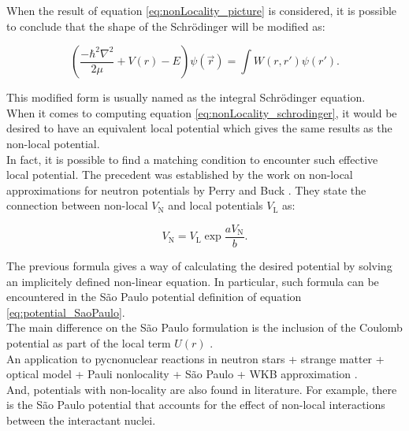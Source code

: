 \documentclass[openany]{book}
\begin{document}
When the result of equation \ref{eq:nonLocality_picture} is considered, it is possible to conclude that the shape of the Schrödinger will be modified as:

\begin{equation} \label{eq:nonLocality_schrodinger}
	\left(\frac{-\hbar^2 \nabla^2}{2\mu} + V(r)  - E  \right) \psi(\vec r) =   \int W(r, r') \psi(r').
\end{equation}

This modified form is usually named as the integral Schrödinger equation. \\

When it comes to computing equation \ref{eq:nonLocality_schrodinger}, it would be desired to have an equivalent local potential which gives the same results as the non-local potential. \\

In fact, it is possible to find a matching condition to encounter such effective local potential. The precedent was established by the work on non-local approximations for neutron potentials by Perry and Buck \cite{perey_buck_1962}. They state the connection between non-local $V_{\mathrm{N}}$ and local potentials $V_{\mathrm{L}}$ as:

\begin{equation}\label{eq:nonLocality_connection}
	V_{\mathrm{N}} = V_{\mathrm{L}} \exp{\frac{a V_{\mathrm{N}}}{b}}.
\end{equation}

The previous formula gives a way of calculating the desired potential by solving an implicitely defined non-linear equation. In particular, such formula can be encountered in the São Paulo potential definition of equation \ref{eq:potential_SaoPaulo}. \\

The main difference on the São Paulo formulation is the inclusion of the Coulomb potential as part of the local term $U(r)$ . \\

An application to pycnonuclear reactions in neutron stars + strange matter + optical model + Pauli nonlocality + São Paulo  + WKB approximation \cite{golf_hellmers_weber_2009}.\\ 


And, potentials with non-locality are also found in literature. For example, there is the São Paulo potential that accounts for the effect of non-local interactions between the interactant nuclei. \\
\end{document}
